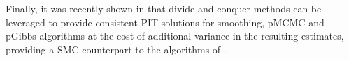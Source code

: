 Finally, it was recently shown in \citet{corenflos2022sequentialized} that divide-and-conquer methods can be leveraged to provide consistent PIT solutions for smoothing, pMCMC and pGibbs algorithms at the cost of additional variance in the resulting estimates, providing a SMC counterpart to the algorithms of \citet{Sarkka2021temporal,yaghoobi2021parallel,Yaghoobi2022sqrt}.


